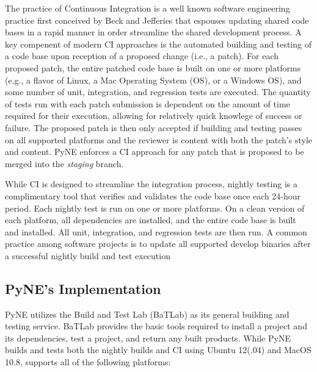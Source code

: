 \documentclass{anstrans}
\begin{document}
The practice of Continuous Integration is a well known software engineering
practice first conceived by Beck and Jefferies \cite{beck1998extreme} that
espouses updating shared code bases in a rapid manner in order streamline the
shared development process. A key compenent of modern CI approaches is the
automated building and testing of a code base upon reception of a proposed
change (i.e., a patch). For each proposed patch, the entire patched code base is
built on one or more platforms (e.g., a flavor of Linux, a Mac Operating System
(OS), or a Windows OS), and some number of unit, integration, and regression
tests are executed. The quantity of tests run with each patch submission is
dependent on the amount of time required for their execution, allowing for
relatively quick knowlege of success or failure. The proposed patch is then only
accepted if building and testing passes on all supported platforms and the
reviewer is content with both the patch's style and content. PyNE enforces a CI
approach for any patch that is proposed to be merged into the \textit{staging}
branch.

While CI is designed to streamline the integration process, nightly testing is a
complimentary tool that verifies and validates the code base once each 24-hour
period. Each nightly test is run on one or more platforms. On a clean version of
each platform, all dependencies are installed, and the entire code base is built
and installed. All unit, integration, and regression tests are then run. A
common practice among software projects is to update all supported develop
binaries after a successful nightly build and test execution

\subsection{PyNE's Implementation}

PyNE utilizes the Build and Test Lab (BaTLab) \cite{batlab_2014} as its general
building and testing service. BaTLab provides the basic tools required to
install a project and its dependencies, test a project, and return any built
products. While PyNE builds and tests both the nightly builds and CI using
Ubuntu 12(.04) and MacOS 10.8, supports all of the following platforms:
\end{document}

